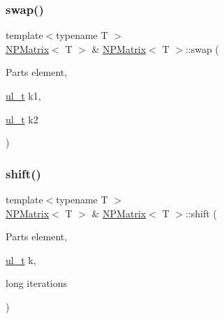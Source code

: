 \subsubsection{\texorpdfstring{swap()}{swap()}\hspace{0.1cm}{\footnotesize\ttfamily [2/2]}}
{\footnotesize\ttfamily template$<$typename T $>$ \\
\mbox{\hyperlink{class_n_p_matrix}{N\+P\+Matrix}}$<$ T $>$ \& \mbox{\hyperlink{class_n_p_matrix}{N\+P\+Matrix}}$<$ T $>$\+::swap (\begin{DoxyParamCaption}\item[{Parts}]{element,  }\item[{\mbox{\hyperlink{group___n_algebra_ga1b140a2034db3f5dfe18a987745df43a}{ul\+\_\+t}}}]{k1,  }\item[{\mbox{\hyperlink{group___n_algebra_ga1b140a2034db3f5dfe18a987745df43a}{ul\+\_\+t}}}]{k2 }\end{DoxyParamCaption})\hspace{0.3cm}{\ttfamily [protected]}}

\mbox{\label{class_n_p_matrix_a83118d4efa26372fd12bd0a2ce77f155}} 
\subsubsection{\texorpdfstring{shift()}{shift()}}
{\footnotesize\ttfamily template$<$typename T $>$ \\
\mbox{\hyperlink{class_n_p_matrix}{N\+P\+Matrix}}$<$ T $>$ \& \mbox{\hyperlink{class_n_p_matrix}{N\+P\+Matrix}}$<$ T $>$\+::shift (\begin{DoxyParamCaption}\item[{Parts}]{element,  }\item[{\mbox{\hyperlink{group___n_algebra_ga1b140a2034db3f5dfe18a987745df43a}{ul\+\_\+t}}}]{k,  }\item[{long}]{iterations }\end{DoxyParamCaption})\hspace{0.3cm}{\ttfamily [protected]}}

\mbox{\label{class_n_p_matrix_a4bff3c9956c688973307fd9c627e0ebd}} 
